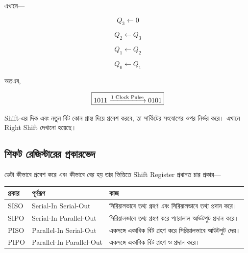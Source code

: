 এখানে—

\[
Q_3\leftarrow0
\]

\[
Q_2\leftarrow Q_3
\]

\[
Q_1\leftarrow Q_2
\]

\[
Q_0\leftarrow Q_1
\]

অতএব,

\[
\boxed{
1011
\xrightarrow{\text{\textenglish{1 Clock Pulse}}}
0101
}
\]

\par\begingroup

\textenglish{Shift}-এর দিক এবং নতুন বিট কোন প্রান্ত দিয়ে প্রবেশ করবে,
তা সার্কিটের সংযোগের ওপর নির্ভর করে।
এখানে \textenglish{Right Shift} দেখানো হয়েছে।
\par\endgroup




\subsection{শিফট রেজিস্টারের প্রকারভেদ}

ডেটা কীভাবে প্রবেশ করে এবং কীভাবে বের হয় তার ভিত্তিতে
\textenglish{Shift Register} প্রধানত চার প্রকার—

\begin{center}
\renewcommand{\arraystretch}{1.25}

\begin{tabularx}
{\textwidth}
{|L{0.14\textwidth}|L{0.29\textwidth}|Y|}

\hline


\textbf{প্রকার}
&
\textbf{পূর্ণরূপ}
&
\textbf{কাজ}
\\
\hline

\textenglish{SISO}
&
\textenglish{Serial-In Serial-Out}
&
সিরিয়ালভাবে তথ্য গ্রহণ এবং সিরিয়ালভাবে তথ্য প্রদান করে।
\\
\hline

\textenglish{SIPO}
&
\textenglish{Serial-In Parallel-Out}
&
সিরিয়ালভাবে তথ্য গ্রহণ করে প্যারালাল আউটপুট প্রদান করে।
\\
\hline

\textenglish{PISO}
&
\textenglish{Parallel-In Serial-Out}
&
একসঙ্গে একাধিক বিট গ্রহণ করে সিরিয়ালভাবে আউটপুট দেয়।
\\
\hline

\textenglish{PIPO}
&
\textenglish{Parallel-In Parallel-Out}
&
একসঙ্গে একাধিক বিট গ্রহণ ও প্রদান করে।
\\
\hline

\end{tabularx}
\end{center}


